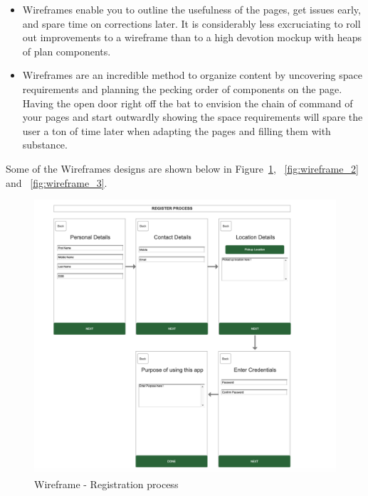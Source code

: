 \begin{itemize}
    \item Wireframes enable you to outline the usefulness of the pages, get issues early, and spare time on corrections later. It is considerably less excruciating to roll out improvements to a wireframe than to a high devotion mockup with heaps of plan components. \\
    \item Wireframes are an incredible method to organize content by uncovering space requirements and planning the pecking order of components on the page. Having the open door right off the bat to envision the chain of command of your pages and start outwardly showing the space requirements will spare the user a ton of time later when adapting the pages and filling them with substance. \\
\end{itemize}

\newpage

Some of the Wireframes designs are shown below in Figure~\ref{fig:wireframe_1}, ~\ref{fig:wireframe_2} and ~\ref{fig:wireframe_3}.

    \begin{figure}[H]
            \centering
            \includegraphics[width=1.0\linewidth]{figures/ch3/wireframe_1.png}
            \caption{\label{fig:wireframe_1} Wireframe - Registration process}
    \end{figure}
  
